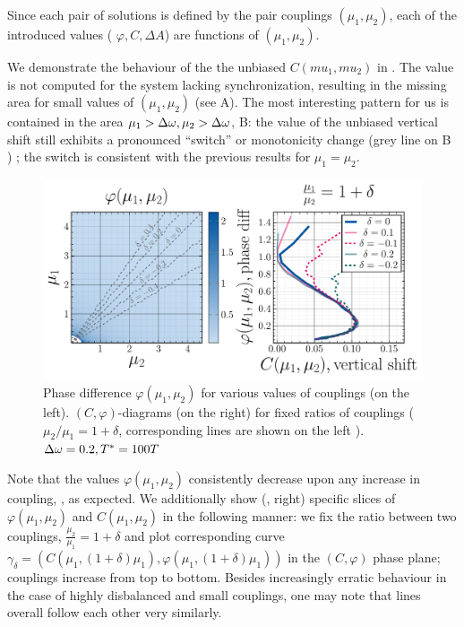 \documentclass{mynotes}
\begin{document}
Since each pair of solutions is defined by the pair couplings \( \left( \mu_1, \mu_2 \right) \), each of the introduced values ( \( \varphi, C, \Delta A \)) are functions of  \( \left( \mu_1, \mu_2 \right) \). 

We demonstrate the behaviour of the the unbiased \( C( mu_1, mu_2 )\) in . The value is not computed for the system lacking synchronization, resulting in the missing area for small values of \( ( \mu_1, \mu_2 ) \) (see A). The most interesting pattern for us is contained in the area \( \mu_1 > \Delta\omega , \mu_2 > \Delta\omega\), B: the value of the unbiased vertical shift still exhibits a pronounced ``switch'' or monotonicity change (grey line on  B ) ; the switch is consistent with the previous results for \( \mu_1 = \mu_2 \).

\begin{figure}[h!]
      \centering
      \includegraphics[width = 0.75\columnwidth]{figures/cphi_heatmap.pdf}
      \caption{
            Phase difference \( \varphi(\mu_1, \mu_2 )\) for various values of couplings (on the left). \( (C, \varphi)\)-diagrams (on the right) for fixed ratios of couplings ( \( \mu_2 / \mu_1 = 1 + \delta \), corresponding lines are shown on the left ).
             \( \Delta\omega = 0.2, T^* = 100 T  \) 
            \label{fig:Cphi_hm}
      }
\end{figure}

Note that the values \( \varphi(\mu_1, \mu_2 )\) consistently decrease upon any increase in coupling, , as expected. We additionally show (, right) specific slices of \( \varphi(\mu_1, \mu_2 )\) and \( C(\mu_1, \mu_2 )\) in the following manner: we fix the ratio between two couplings, \( \frac{\mu_2}{\mu_1} = 1 + \delta \) and plot corresponding curve \( \gamma_\delta = ( C(\mu_1, (1+\delta)\mu_1 ), \varphi(\mu_1, (1+\delta)\mu_1 )  )\) in the \( ( C, \varphi ) \) phase plane; couplings increase from top to bottom. Besides increasingly erratic behaviour in the case of highly disbalanced and small couplings, one may note that lines overall follow each other very similarly. 




















\clearpage
\nocite{*}


\end{document}

